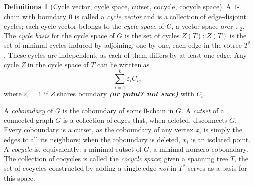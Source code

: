 \documentclass[11pt]{article}
\theoremstyle{definition}
\newtheorem*{definitions*}{Definitions}
\newcommand{\F}{\mathbb{F}}			%
\newcommand{\question}[1]{{\color{brightlavender}\textit{\textbf{(#1)}}}}
\begin{document}
		\begin{definitions*}[Cycle vector, cycle space, cutset, cocycle, cocycle space]
			A $1$-chain with boundary $0$ is called a \textit{cycle vector} and is a collection of edge-disjoint cycles; each cycle vector belongs to the \textit{cycle space} of $G$, a vector space over $\F_2$. The \textit{cycle basis} for the cycle space of $G$ is the set of cycles $Z(T)$: $Z(T)$ is the set of minimal cycles induced by adjoining, one-by-one, each edge in the cotree $T^*$. These cycles are independent, as each of them differs by at least one edge. Any cycle $Z$ in the cycle space of $T$ can be written as $$ \sum_{i=1}^k \varepsilon_i C_i,$$ where $\varepsilon_i = 1$ if $Z$ shares boundary \question{or point? not sure} with $C_i$.
			
			A \textit{coboundary} of $G$ is the coboundary of some $0$-chain in $G$. A \textit{cutset} of a connected graph $G$ is a collection of edges that, when deleted, disconnects $G$. Every coboundary is a cutset, as the coboundary of any vertex $x_i$ is simply the edges to all its neighbors; when the coboundary is deleted, $x_i$ is an isolated point. A \textit{cocycle} is, equivalently: a minimal cutset of $G$; a minimal nonzero coboundary. The collection of cocycles is called the \textit{cocycle space}; given a spanning tree $T$, the set of cocycles constructed by adding a single edge \textit{not} in $T^*$ serves as a basis for this space.
		\end{definitions*}
		
\end{document}
